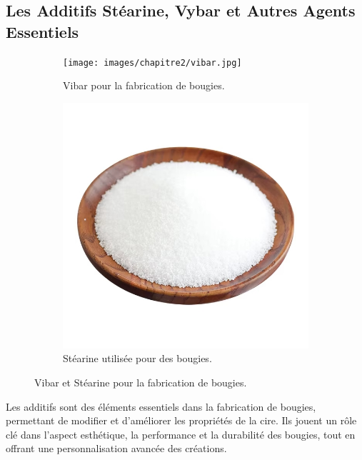 \documentclass[11pt,fleqn,onecolumn,oneside]{book}
\begin{document}
\subsection*{Les Additifs Stéarine, Vybar et Autres Agents Essentiels}

\begin{figure}[htbp]
    \centering
    \begin{subfigure}[b]{0.45\textwidth} %
        \texttt{[image: images/chapitre2/vibar.jpg]}
        \caption{Vibar pour la fabrication de bougies.}
        \label{fig:cire_soja}
    \end{subfigure}
    \hfill %
    \begin{subfigure}[b]{0.45\textwidth} %
        \includegraphics[width=\textwidth]{Pictures/images/chapitre2/stearine.jpg}
        \caption{Stéarine utilisée pour des bougies.}
        \label{fig:paraffine_solide}
    \end{subfigure}
    \caption{Vibar et Stéarine pour la fabrication de bougies.}
    \label{fig:comparaison_cires}
\end{figure}


\begin{definition}
Les additifs sont des éléments essentiels dans la fabrication de bougies, permettant de modifier et d’améliorer les propriétés de la cire. Ils jouent un rôle clé dans l’aspect esthétique, la performance et la durabilité des bougies, tout en offrant une personnalisation avancée des créations.
\end{definition}
\end{document}
